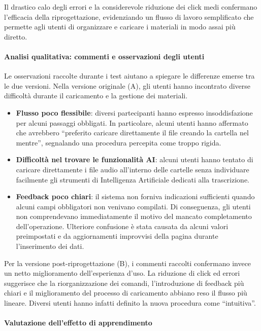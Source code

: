 Il drastico calo degli errori e la considerevole riduzione dei click medi confermano l'efficacia della riprogettazione, evidenziando un flusso di lavoro semplificato che permette agli utenti di organizzare e caricare i materiali in modo assai più diretto.

\paragraph{Analisi qualitativa: commenti e osservazioni degli utenti}

Le osservazioni raccolte durante i test aiutano a spiegare le differenze emerse tra le due versioni. Nella versione originale (A), gli utenti hanno incontrato diverse difficoltà durante il caricamento e la gestione dei materiali.

\begin{itemize}
	\item \textbf{Flusso poco flessibile}: diversi partecipanti hanno espresso insoddisfazione per alcuni passaggi obbligati. In particolare, alcuni utenti hanno affermato che avrebbero ``preferito caricare direttamente il file creando la cartella nel mentre'', segnalando una procedura percepita come troppo rigida.
	\item \textbf{Difficoltà nel trovare le funzionalità AI}: alcuni utenti hanno tentato di caricare direttamente i file audio all'interno delle cartelle senza individuare facilmente gli strumenti di Intelligenza Artificiale dedicati alla trascrizione.

	\item \textbf{Feedback poco chiari}: il sistema non forniva indicazioni sufficienti quando alcuni campi obbligatori non venivano compilati. Di conseguenza, gli utenti non comprendevano immediatamente il motivo del mancato completamento dell'operazione. Ulteriore confusione è stata causata da alcuni valori preimpostati e da aggiornamenti improvvisi della pagina durante l'inserimento dei dati.
\end{itemize}

Per la versione post-riprogettazione (B), i commenti raccolti confermano invece un netto miglioramento dell'esperienza d'uso. La riduzione di click ed errori suggerisce che la riorganizzazione dei comandi, l'introduzione di feedback più chiari e il miglioramento del processo di caricamento abbiano reso il flusso più lineare. Diversi utenti hanno infatti definito la nuova procedura come ``intuitiva''.

\paragraph{Valutazione dell'effetto di apprendimento}

